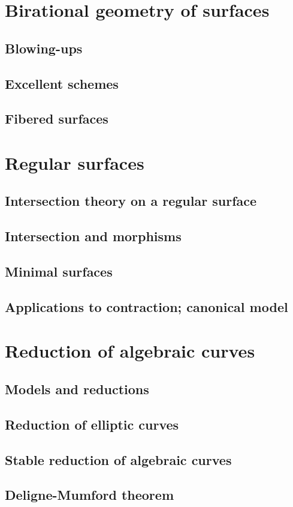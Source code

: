 \documentclass[oneside]{amsbook}
\begin{document}
\chapter{Birational geometry of surfaces}
\section{Blowing-ups}

\section{Excellent schemes}

\section{Fibered surfaces}


\chapter{Regular surfaces}
\section{Intersection theory on a regular surface}

\section{Intersection and morphisms}

\section{Minimal surfaces}

\section{Applications to contraction; canonical model}


\chapter{Reduction of algebraic curves}
\section{Models and reductions}

\section{Reduction of elliptic curves}

\section{Stable reduction of algebraic curves}

\section{Deligne-Mumford theorem}

\end{document}
